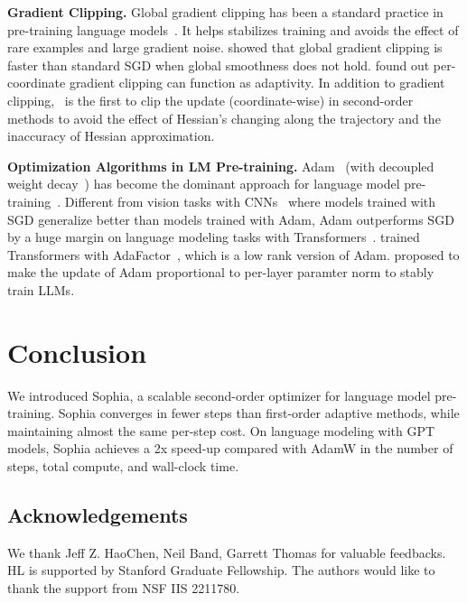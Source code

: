 \textbf{Gradient Clipping.} Global gradient clipping has been a standard practice in pre-training language models~\citep{merity2017regularizing,radford2019language,izsak2021train,zhang2022opt}. It helps stabilizes training and avoids the effect of rare examples and large gradient noise. \citet{zhang2019gradient,mai2021stability} showed that global gradient clipping is faster than standard SGD when global smoothness does not hold. \citet{zhang2020adaptive,crawshaw2022robustness} found out per-coordinate gradient clipping can function as adaptivity. In addition to gradient clipping, \ours~is the first to clip the update (coordinate-wise) in second-order methods to avoid the effect of Hessian's changing along the trajectory and the inaccuracy of Hessian approximation. 

\textbf{Optimization Algorithms in LM Pre-training.} Adam~\citep{kingma2014Adam} (with decoupled weight decay~\citep{loshchilov2017decoupled}) has become the dominant approach for language model pre-training~\citep{vaswani2017attention,devlin2018bert,radford2019language,brown2020language,zhang2022opt,touvron2023llama}. Different from vision tasks with CNNs~\citep{he2016deep} where models trained with SGD generalize better than models trained with Adam, Adam outperforms SGD by a huge margin on language modeling tasks with Transformers~\citep{anil2019memory,liu2020understanding,kunstner2023noise}. \citet{raffel2020exploring,chowdhery2022palm} trained Transformers with AdaFactor~\citep{shazeer2018adafactor}, which is a low rank version of Adam. \citet{you2019large} proposed to make the update of Adam proportional to per-layer paramter norm to stably train LLMs. 

\section{Conclusion}
We introduced Sophia, a scalable second-order optimizer for language model pre-training. Sophia converges in fewer steps than first-order adaptive methods, while maintaining almost the same per-step cost. On language modeling with GPT models, Sophia achieves a 2x speed-up compared with AdamW in the number of steps, total compute, and wall-clock time.

\subsection*{Acknowledgements}

We thank Jeff Z. HaoChen, Neil Band, Garrett Thomas for valuable feedbacks.
HL is supported by Stanford Graduate Fellowship. The authors
would like to thank the support from NSF IIS 2211780.